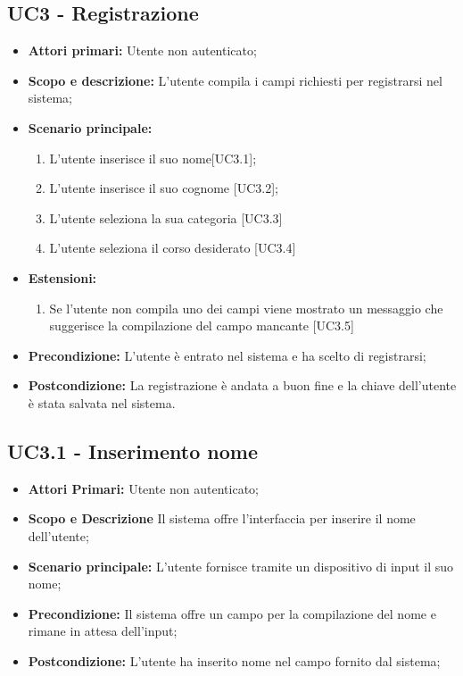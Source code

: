 \documentclass[AnalisiDeiRequisiti.tex]{subfiles}
\begin{document}
\subsection{UC3 - Registrazione}
\begin{itemize}
	\item \textbf{Attori primari:} Utente non autenticato;\\
	\item \textbf{Scopo e descrizione:} L'utente compila i campi richiesti per registrarsi nel sistema;\\
	\item \textbf{Scenario principale:}
	\begin{enumerate}
		\item L'utente inserisce il suo nome[UC3.1];
		\item L'utente inserisce il suo cognome [UC3.2];
		\item L'utente seleziona la sua categoria [UC3.3]
		\item L'utente seleziona il corso desiderato [UC3.4]
	\end{enumerate}
	\item \textbf{Estensioni:}
	\begin{enumerate}
		\item Se l'utente non compila uno dei campi viene mostrato un messaggio che suggerisce la compilazione del campo mancante [UC3.5]
	\end{enumerate}
	\item \textbf{Precondizione:} L'utente è entrato nel sistema e ha scelto di registrarsi;\\
	\item \textbf{Postcondizione:} La registrazione è andata a buon fine e la chiave dell'utente è stata salvata nel sistema.\\
\end{itemize}
\subsection{UC3.1 - Inserimento nome}
\begin{itemize}
	\item \textbf{Attori Primari:} Utente non autenticato;
	\item \textbf{Scopo e Descrizione} Il sistema offre l'interfaccia per inserire il nome dell'utente;
	\item \textbf{Scenario principale:} L'utente fornisce tramite un dispositivo di input il suo nome;
	\item \textbf{Precondizione:} Il sistema offre un campo per la compilazione del nome e rimane in attesa dell'input;
	\item \textbf{Postcondizione:} L'utente ha inserito nome nel campo fornito dal sistema;
\end{itemize}	
\end{document}
